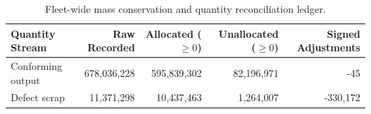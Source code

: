 \begin{table}[!htbp]
\centering
\caption{Fleet-wide mass conservation and quantity reconciliation ledger.}
\label{tab:quantity_reconciliation}
\renewcommand{\arraystretch}{1.15}
\small
\begin{tabularx}{\textwidth}{Xrrrr}
\toprule
\textbf{Quantity Stream} & \textbf{Raw Recorded} & \textbf{Allocated ($\ge 0$)} & \textbf{Unallocated ($\ge 0$)} & \textbf{Signed Adjustments} \\
\midrule
Conforming output & 678,036,228 & 595,839,302 & 82,196,971 & -45 \\
Defect scrap & 11,371,298 & 10,437,463 & 1,264,007 & -330,172 \\
\bottomrule
\end{tabularx}
\end{table}
